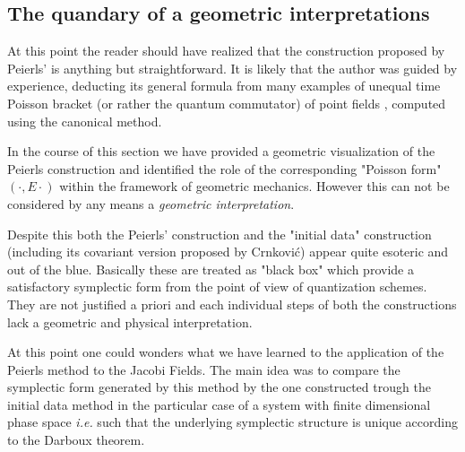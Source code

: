 \documentclass[Main]{subfiles}
\begin{document}
	\subsection{The quandary of a geometric interpretations}
		At this point the reader should have realized that the construction proposed by Peierls' is anything but straightforward.
		It is likely that the author was guided by experience, deducting its general formula from many examples of unequal time Poisson bracket (or rather the quantum commutator) of point fields , computed using the canonical method.
		
		In the course of this section we have provided a geometric visualization of the Peierls construction and identified the role of the corresponding "Poisson form" $(\cdot, E \cdot )$  within the framework of geometric mechanics.
		However this can not be considered by any means a \emph{geometric interpretation}.

				
				
		Despite this both the Peierls' construction and the "initial data" construction (including its covariant version proposed by Crnković) appear quite esoteric and out of the blue.
		Basically these are treated as "black box" which provide a satisfactory symplectic form  from the point of view of quantization schemes.
		They are not justified a priori and each individual steps of both the constructions lack a geometric and physical interpretation.
		
		
		At this point one could wonders what we have learned to the application of the Peierls method to the Jacobi Fields.
		The main idea was to compare the symplectic form generated by this method by the one constructed trough the initial data method in the particular case of a system with finite dimensional phase space \textit{i.e.} such that the underlying symplectic structure is unique according to the Darboux theorem.
\end{document}
